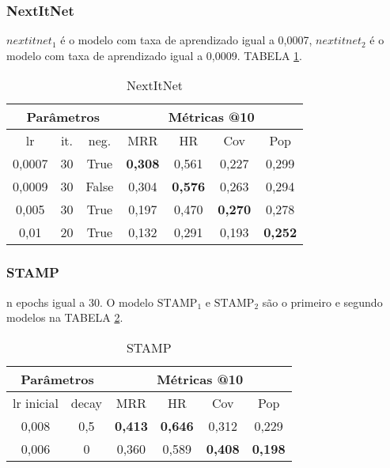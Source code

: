 \subsubsection{NextItNet}
$nextitnet_1$ é o modelo com taxa de aprendizado igual a 0,0007, $nextitnet_2$ é
o modelo com taxa de aprendizado igual a 0,0009. TABELA \ref{app:nextitnet2}.
\begin{table}[htbp]
  \centering
  \begin{tabular}{|c|c|c|c|c|c|c|}
    \hline
      \multicolumn{3}{|c|}{Parâmetros} & \multicolumn{4}{c|}{Métricas @10} \\
      \hline
      lr & it. & neg. & MRR & HR & Cov & Pop \\
      \hline
      0,0007 & 30 & True & \textbf{0,308} & 0,561 & 0,227 & 0,299 \\
      \hline
      0,0009 & 30 & False & 0,304 & \textbf{0,576} & 0,263 & 0,294 \\
      \hline
      0,005 & 30 & True & 0,197 & 0,470 & \textbf{0,270} & 0,278 \\
      \hline
      0,01 & 20 & True & 0,132 & 0,291 & 0,193 & \textbf{0,252} \\
      \hline
    \end{tabular} \label{app:nextitnet2}
    \caption{NextItNet}
\end{table}

\subsubsection{STAMP}

n epochs igual a 30. O modelo $\text{STAMP}_{1}$ e $\text{STAMP}_{2}$
são o primeiro e segundo modelos na TABELA \ref{app:stamp2}.

\begin{table}[htbp]
  \centering
  \begin{tabular}{|c|c|c|c|c|c|}
    \hline
      \multicolumn{2}{|c|}{Parâmetros} & \multicolumn{4}{c|}{Métricas @10} \\
      \hline
      lr inicial & decay & MRR & HR & Cov & Pop \\
      \hline
      0,008 & 0,5 & \textbf{0,413} & \textbf{0,646} & 0,312 & 0,229 \\
      \hline
      0,006 & 0 & 0,360 & 0,589 & \textbf{0,408} & \textbf{0,198} \\
      \hline
    \end{tabular} \label{app:stamp2}
    \caption{STAMP}
\end{table}


